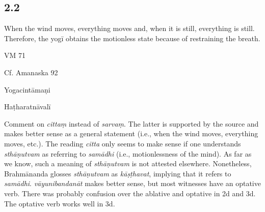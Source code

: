 \begin{ekdosis}
\subsection*{2.2}
\begin{translation}[hp02_002]
When the wind moves, everything moves and, when it is still, everything is still. Therefore, the yogī obtains the motionless state because of restraining the breath.
\end{translation}

\begin{sources}[hp02_002]
VM 71

\begin{versinnote}
\end{versinnote}
Cf. Amanaska 92

\begin{versinnote}
\end{versinnote}
\end{sources}

\begin{testimonia}[hp02_002]
Yogacintāmaṇi

\begin{versinnote}
\end{versinnote}
Haṭharatnāvalī

\begin{versinnote}
\end{versinnote}

\end{testimonia}

\begin{philcomm}[hp02_002]
Comment on \emph{cittaṃ} instead of \emph{sarvaṃ}. The latter is supported by the source and makes better sense as a general statement (i.e., when the wind moves, everything moves, etc.). The reading \emph{citta} only seems to make sense if one understands \emph{sthāṇutvam} as referring to \emph{samādhi} (i.e., motionlessness of the mind). As far as we know, such a meaning of \emph{sthāṇutvam} is not attested elsewhere. Nonetheless, Brahmānanda glosses \emph{sthāṇutvam} as \emph{kāṣṭhavat}, implying that it refers to \emph{samādhi}.
\emph{vāyunibandanāt} makes better sense, but most witnesses have an optative verb. There was probably confusion over the ablative and optative in 2d and 3d. The optative verb works well in 3d.
\end{philcomm}


\end{ekdosis}
